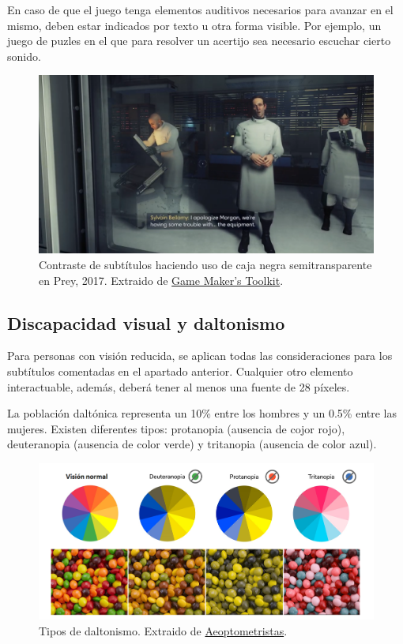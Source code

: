 En caso de que el juego tenga elementos auditivos necesarios para avanzar en el mismo, deben estar indicados por texto u otra forma visible. Por ejemplo, un juego de puzles en el que para resolver un acertijo sea necesario escuchar cierto sonido.

\begin{figure}[h]
    \centering
    \includegraphics[scale=0.28]{img/gmtk-subtitles.png}
    \caption[Contraste de subtítulos en Prey]{Contraste de subtítulos haciendo uso de caja negra semitransparente en Prey, 2017. Extraido de \href{https://www.youtube.com/@GMTK}{Game Maker's Toolkit}.}
    \label{fig:gmtk-subtitles}
\end{figure}

\subsection{Discapacidad visual y daltonismo}

Para personas con visión reducida, se aplican todas las consideraciones para los subtítulos comentadas en el apartado anterior. Cualquier otro elemento interactuable, además, deberá tener al menos una fuente de 28 píxeles.

La población daltónica representa un 10\% entre los hombres y un 0.5\% entre las mujeres. Existen diferentes tipos: protanopia (ausencia de cojor rojo), deuteranopia (ausencia de color verde) y tritanopia (ausencia de color azul).

\begin{figure}[h]
    \centering
    \includegraphics[scale=0.28]{img/daltonismo.png}
    \caption[Tipos de daltonismo]{Tipos de daltonismo. Extraido de \href{https://optometristas.org/tratamiento-del-daltonismo}{Aeoptometristas}.}
    \label{fig:daltonismo}
\end{figure}

